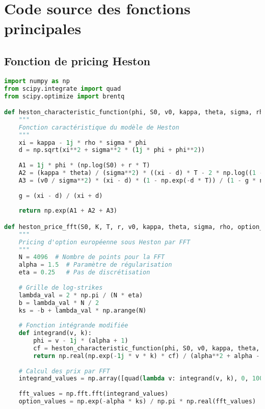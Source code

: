 \section{Code source des fonctions principales}

\subsection{Fonction de pricing Heston}

\begin{lstlisting}[language=Python, caption=Implémentation du pricing Heston]
import numpy as np
from scipy.integrate import quad
from scipy.optimize import brentq

def heston_characteristic_function(phi, S0, v0, kappa, theta, sigma, rho, T, r):
    """
    Fonction caractéristique du modèle de Heston
    """
    xi = kappa - 1j * rho * sigma * phi
    d = np.sqrt(xi**2 + sigma**2 * (1j * phi + phi**2))
    
    A1 = 1j * phi * (np.log(S0) + r * T)
    A2 = (kappa * theta) / (sigma**2) * ((xi - d) * T - 2 * np.log((1 - g * np.exp(-d * T)) / (1 - g)))
    A3 = (v0 / sigma**2) * (xi - d) * (1 - np.exp(-d * T)) / (1 - g * np.exp(-d * T))
    
    g = (xi - d) / (xi + d)
    
    return np.exp(A1 + A2 + A3)

def heston_price_fft(S0, K, T, r, v0, kappa, theta, sigma, rho, option_type='call'):
    """
    Pricing d'option européenne sous Heston par FFT
    """
    N = 4096  # Nombre de points pour la FFT
    alpha = 1.5  # Paramètre de régularisation
    eta = 0.25   # Pas de discrétisation
    
    # Grille de log-strikes
    lambda_val = 2 * np.pi / (N * eta)
    b = lambda_val * N / 2
    ks = -b + lambda_val * np.arange(N)
    
    # Fonction intégrande modifiée
    def integrand(v, k):
        phi = v - 1j * (alpha + 1)
        cf = heston_characteristic_function(phi, S0, v0, kappa, theta, sigma, rho, T, r)
        return np.real(np.exp(-1j * v * k) * cf) / (alpha**2 + alpha - v**2 + 1j * (2 * alpha + 1) * v)
    
    # Calcul des prix par FFT
    integrand_values = np.array([quad(lambda v: integrand(v, k), 0, 100)[0] for k in ks])
    
    fft_values = np.fft.fft(integrand_values)
    option_values = np.exp(-alpha * ks) / np.pi * np.real(fft_values)
    

\end{lstlisting}
